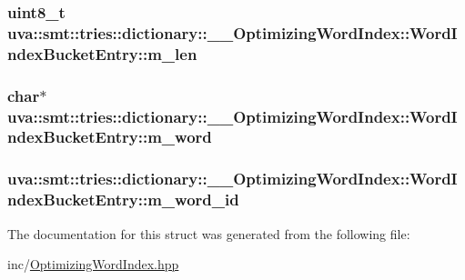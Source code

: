 \subsubsection[{m\+\_\+len}]{\setlength{\rightskip}{0pt plus 5cm}uint8\+\_\+t uva\+::smt\+::tries\+::dictionary\+::\+\_\+\+\_\+\+Optimizing\+Word\+Index\+::\+Word\+Index\+Bucket\+Entry\+::m\+\_\+len}\label{structuva_1_1smt_1_1tries_1_1dictionary_1_1_____optimizing_word_index_1_1_word_index_bucket_entry_a7456cc27788d452e912cef793f628cc9}
\hypertarget{structuva_1_1smt_1_1tries_1_1dictionary_1_1_____optimizing_word_index_1_1_word_index_bucket_entry_a06876be3c5fcc6f5330ee9b1c2ac3b68}{}
\subsubsection[{m\+\_\+word}]{\setlength{\rightskip}{0pt plus 5cm}char$\ast$ uva\+::smt\+::tries\+::dictionary\+::\+\_\+\+\_\+\+Optimizing\+Word\+Index\+::\+Word\+Index\+Bucket\+Entry\+::m\+\_\+word}\label{structuva_1_1smt_1_1tries_1_1dictionary_1_1_____optimizing_word_index_1_1_word_index_bucket_entry_a06876be3c5fcc6f5330ee9b1c2ac3b68}
\hypertarget{structuva_1_1smt_1_1tries_1_1dictionary_1_1_____optimizing_word_index_1_1_word_index_bucket_entry_aeb0232a62ec2e44988b8ab87cac016fc}{}
\subsubsection[{m\+\_\+word\+\_\+id}]{ uva\+::smt\+::tries\+::dictionary\+::\+\_\+\+\_\+\+Optimizing\+Word\+Index\+::\+Word\+Index\+Bucket\+Entry\+::m\+\_\+word\+\_\+id}\label{structuva_1_1smt_1_1tries_1_1dictionary_1_1_____optimizing_word_index_1_1_word_index_bucket_entry_aeb0232a62ec2e44988b8ab87cac016fc}


The documentation for this struct was generated from the following file\+:\begin{DoxyCompactItemize}
\item 
inc/\hyperlink{_optimizing_word_index_8hpp}{Optimizing\+Word\+Index.\+hpp}\end{DoxyCompactItemize}
